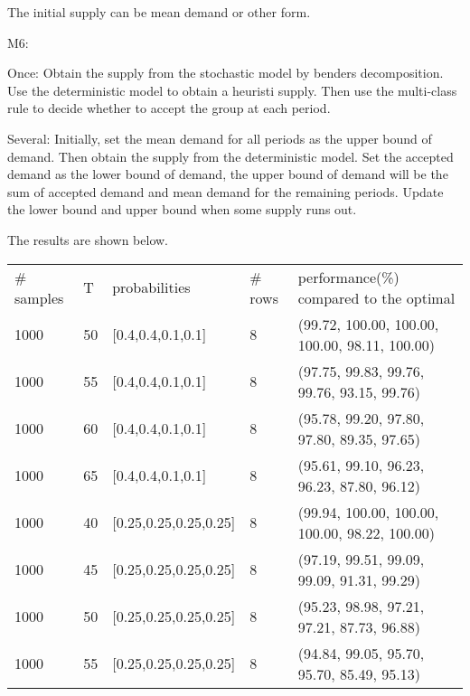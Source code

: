 The initial supply can be mean demand or other form. 

M6: 



Once: Obtain the supply from the stochastic model by benders decomposition. Use the deterministic model to obtain a heuristi supply. Then use the multi-class rule to decide whether to accept the group at each period.

Several: Initially, set the mean demand for all periods as the upper bound of demand. Then obtain the supply from the deterministic model. Set the accepted demand as the lower bound of demand, the upper bound of demand will be the sum of accepted demand and mean demand for the remaining periods. Update the lower bound and upper bound when some supply runs out.



The results are shown below.


\begin{table}[ht]
  \begin{tabular}{l|l|l|l|l}
  \hline
  \# samples & T & probabilities & \# rows & performance(\%) compared to the optimal \\
  1000  & 50  & [0.4,0.4,0.1,0.1] & 8 & (99.72, 100.00, 100.00, 100.00, 98.11, 100.00) \\
  1000  & 55  & [0.4,0.4,0.1,0.1] & 8 & (97.75, 99.83, 99.76, 99.76, 93.15, 99.76) \\ %
  1000  & 60  & [0.4,0.4,0.1,0.1] & 8 & (95.78, 99.20, 97.80, 97.80, 89.35, 97.65) \\
  1000  & 65  & [0.4,0.4,0.1,0.1] & 8 & (95.61, 99.10, 96.23, 96.23, 87.80, 96.12) \\
  \hline
  1000  & 40  & [0.25,0.25,0.25,0.25] & 8 & (99.94, 100.00, 100.00, 100.00, 98.22, 100.00) \\
  1000  & 45  & [0.25,0.25,0.25,0.25] & 8 & (97.19, 99.51, 99.09, 99.09, 91.31, 99.29) \\
  1000  & 50  & [0.25,0.25,0.25,0.25] & 8 & (95.23, 98.98, 97.21, 97.21, 87.73, 96.88) \\
  1000  & 55  & [0.25,0.25,0.25,0.25] & 8 & (94.84, 99.05, 95.70, 95.70, 85.49, 95.13) \\
  \end{tabular}
\end{table}

\newpage
